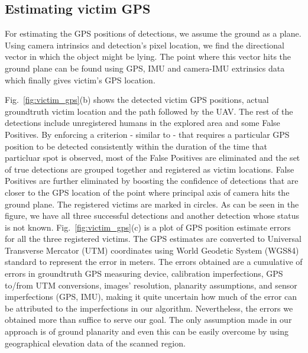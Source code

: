 \documentclass[runningheads]{llncs}
\begin{document}
\subsection{Estimating victim GPS}

For estimating the GPS positions of detections, we assume the ground as a plane. Using camera intrinsics and detection's pixel location, we find the directional vector in which the object might be lying. The point where this vector hits the ground plane can be found using GPS, IMU and camera-IMU extrinsics data which finally gives victim's GPS location.

Fig.~\ref{fig:victim_gps}(b) shows the detected victim GPS positions, actual groundtruth victim location and the path followed by the UAV. The rest of the detections include unregistered humans in the explored area and some False Positives. By enforcing a criterion - similar to \cite{rudol2008human} - that requires a particular GPS position to be detected consistently within the duration of the time that particluar spot is observed, most of the False Positives are eliminated and the set of true detections are grouped together and registered as victim locations. False Positives are further eliminated by boosting the confidence of detections that are closer to the GPS location of the point where principal axis of camera hits the ground plane. The registered victims are marked in circles. As can be seen in the figure, we have all three successful detections and another detection whose status is not known. Fig.~\ref{fig:victim_gps}(c) is a plot of GPS position estimate errors for all the three registered victims. The GPS estimates are converted to Universal Transverse Mercator (UTM) coordinates using World Geodetic System (WGS84) standard \cite{WGS} to represent the error in meters. The errors obtained are a cumulative of errors in groundtruth GPS measuring device, calibration imperfections, GPS to/from UTM conversions, images' resolution, planarity assumptions, and sensor imperfections (GPS, IMU), making it quite uncertain how much of the error can be attributed to the imperfections in our algorithm. Nevertheless, the errors we obtained more than suffice to serve our goal. The only assumption made in our approach is of ground planarity and even this can be easily overcome by using geographical elevation data of the scanned region.
\end{document}
